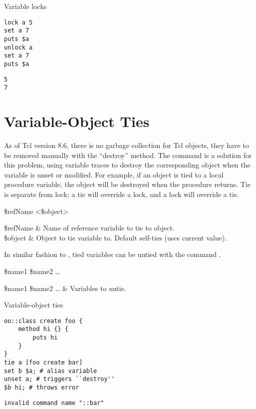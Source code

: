 \documentclass{article}
\begin{document}
\begin{example}{Variable locks}
\begin{lstlisting}
lock a 5
set a 7
puts $a
unlock a
set a 7
puts $a
\end{lstlisting}
\tcblower
\begin{lstlisting}
5
7
\end{lstlisting}
\end{example}

\clearpage

\section{Variable-Object Ties}
As of Tcl version 8.6, there is no garbage collection for Tcl objects, they have to be removed manually with the ``destroy'' method. 
The command  is a solution for this problem, using variable traces to destroy the corresponding object when the variable is unset or modified. 
For example, if an object is tied to a local procedure variable, the object will be destroyed when the procedure returns.
Tie is separate from lock; a tie will override a lock, and a lock will override a tie. 
\begin{syntax}
 \$refName <\$object>
\end{syntax}
\begin{args}
\$refName & Name of reference variable to tie to object. \\
\$object & Object to tie variable to. Default self-ties (uses current value).
\end{args}

In similar fashion to , tied variables can be untied with the command .

\begin{syntax}
 \$name1 \$name2 …
\end{syntax}
\begin{args}
\$name1 \$name2 … & Variables to untie.
\end{args}

\begin{example}{Variable-object ties}
\begin{lstlisting}
oo::class create foo {
    method hi {} {
        puts hi
    }
}
tie a [foo create bar]
set b $a; # alias variable
unset a; # triggers ``destroy''
$b hi; # throws error
\end{lstlisting}
\tcblower
\begin{lstlisting}
invalid command name "::bar"
\end{lstlisting}
\end{example}
\clearpage
\end{document}
